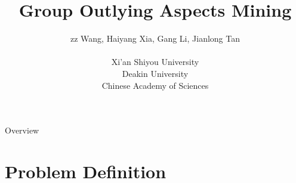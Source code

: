 \documentclass[
 size=14pt,
 paper=smartboard,  %
 mode=present, 		%
 display=slides, 	%
 style=tuliplab,  	%
 pauseslide,
 fleqn,leqno]{powerdot}
\title{Group Outlying Aspects Mining}
\author{
zz Wang, Haiyang Xia, Gang Li, Jianlong Tan
\\
\\Xi'an Shiyou University
\\Deakin University
\\Chinese Academy of Sciences
}
\date{\gitCommitterDate}
\begin{document}
\maketitle



\begin{slide}[toc=,bm=]{Overview}
\tableofcontents[content=currentsection,type=1]
\end{slide}


\section{Problem Definition}
\end{document}

